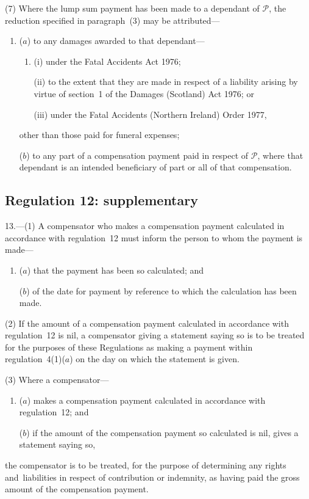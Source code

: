 \documentclass[12pt,a4paper]{article}
\begin{document}
(7) Where the lump sum payment has been made to a dependant of $\mathcal{P}$, the reduction specified in paragraph~(3) may be attributed—
\begin{enumerate}\item[]
($a$) to any damages awarded to that dependant—
\begin{enumerate}\item[]
(i) under the Fatal Accidents Act 1976;

(ii) to the extent that they are made in respect of a liability arising by virtue of section~1 of the Damages (Scotland) Act 1976; or

(iii) under the Fatal Accidents (Northern Ireland) Order 1977,
\end{enumerate}
other than those paid for funeral expenses;

($b$) to any part of a compensation payment paid in respect of $\mathcal{P}$, where that dependant is an intended beneficiary of part or all of that compensation.
\end{enumerate}

\subsection[13. Regulation 12: supplementary]{Regulation 12: supplementary}

13.---(1)  A compensator who makes a compensation payment calculated in accordance with regulation~12 must inform the person to whom the payment is made—
\begin{enumerate}\item[]
($a$) that the payment has been so calculated; and

($b$) of the date for payment by reference to which the calculation has been made.
\end{enumerate}

(2) If the amount of a compensation payment calculated in accordance with regulation~12 is nil, a compensator giving a statement saying so is to be treated for the purposes of these Regulations as making a payment within regulation~4(1)($a$)  on the day on which the statement is given.

(3) Where a compensator—
\begin{enumerate}\item[]
($a$) makes a compensation payment calculated in accordance with regulation~12; and

($b$) if the amount of the compensation payment so calculated is nil, gives a statement saying so,
\end{enumerate}
the compensator is to be treated, for the purpose of determining any rights and~liabilities in respect of contribution or indemnity, as having paid the gross amount of the compensation payment.
\end{document}
